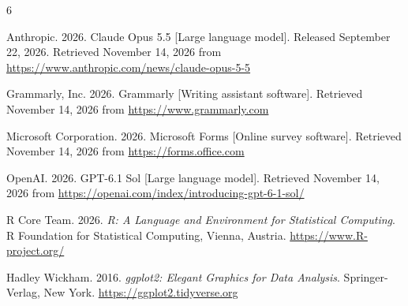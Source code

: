 \documentclass[sigconf,nonacm]{acmart}
\begin{document}
\begin{thebibliography}{6}

Anthropic. 2026.
\newblock Claude Opus 5.5 [Large language model].
\newblock Released September 22, 2026. Retrieved November 14, 2026 from \url{https://www.anthropic.com/news/claude-opus-5-5}

Grammarly, Inc. 2026.
\newblock Grammarly [Writing assistant software].
\newblock Retrieved November 14, 2026 from \url{https://www.grammarly.com}

Microsoft Corporation. 2026.
\newblock Microsoft Forms [Online survey software].
\newblock Retrieved November 14, 2026 from \url{https://forms.office.com}

OpenAI. 2026.
\newblock GPT-6.1 Sol [Large language model].
\newblock Retrieved November 14, 2026 from \url{https://openai.com/index/introducing-gpt-6-1-sol/}

R Core Team. 2026.
\newblock \emph{R: A Language and Environment for Statistical Computing}.
\newblock R Foundation for Statistical Computing, Vienna, Austria.
\newblock \url{https://www.R-project.org/}

Hadley Wickham. 2016.
\newblock \emph{ggplot2: Elegant Graphics for Data Analysis}.
\newblock Springer-Verlag, New York.
\newblock \url{https://ggplot2.tidyverse.org}

\end{thebibliography}



\clearpage
\onecolumn
\appendix
\end{document}
